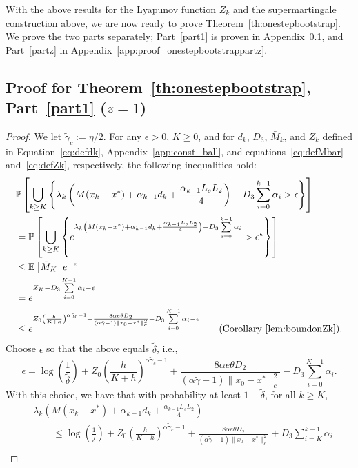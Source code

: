 \documentclass{article}
\newcommand{\lrset}[1]{\left\{ #1 \right\}}
\newcommand{\lrp}[1]{\left( #1 \right)}
\newcommand{\lrs}[1]{\left[ #1 \right]}
\newcommand{\E}[1]{\mathbb{E}\lrs{#1}}
\newcommand{\Prob}[1]{\mathbb{P}\lrs{#1}}
\begin{document}
With the above results for the Lyapunov function $Z_k$ and the supermartingale construction above, we are now ready to prove Theorem~\ref{th:onestepbootstrap}. We prove the two parts separately; Part~\ref{part1} is proven in Appendix~\ref{app:proof_onestepbootstrappart1}, and Part~\ref{partz} in Appendix~\ref{app:proof_onestepbootstrappartz}. 
\subsection{Proof for Theorem~\ref{th:onestepbootstrap}, Part~\ref{part1} ($z = 1$)}\label{app:proof_onestepbootstrappart1}
\begin{proof}
    We let $\tilde{\gamma}_c := \eta/2$.  For any $\epsilon > 0$, $K \ge 0$, and for $d_k$, $D_3$, $\bar{M}_k$, and $Z_k$ defined in Equation~\eqref{eq:defdk}, Appendix~\ref{app:const_ball}, and equations~\eqref{eq:defMbar} and~\eqref{eq:defZk},  respectively, the following inequalities hold: 
    \begin{align*}
        &\Prob{\bigcup\limits_{ k \ge K} \lrset{ \lambda_k \lrp{ M(x_k - x^*) + \alpha_{k-1} d_k + \frac{\alpha_{k-1} L_sL_2}{4}} - D_3\sum\limits_{i=0}^{k-1} \alpha_i   > \epsilon } }\\
        &= \Prob{\bigcup\limits_{ k \ge K} \lrset{ e^{\lambda_k \lrp{ M(x_k - x^*) + \alpha_{k-1} d_k + \frac{\alpha_{k-1} L_sL_2}{4}} - D_3\sum\limits_{i=0}^{k-1} \alpha_i }  > e^{\epsilon}} } \\
        &\le \E{\bar{M}_K} e^{-\epsilon} \\
        &= e^{Z_K - D_3 \sum\limits_{i=0}^{K-1}\alpha_i - \epsilon} \\
        &\le e^{Z_0\lrp{\frac{h}{K+h}}^{\alpha\tilde{\gamma}_c - 1} + \frac{8 \alpha e \theta D_2}{(\alpha \tilde{\gamma} - 1)\|x_0 - x^*\|^2_c}  - D_3 \sum\limits_{i=0}^{K-1}\alpha_i - \epsilon} \tag{Corollary~\ref{lem:boundonZk}}.
    \end{align*}
Choose $\epsilon$ so that the above equals $\tilde{\delta}$, i.e., 
\[ \epsilon = \log\left(\frac{1}{\tilde{\delta}}\right) + Z_0\lrp{\frac{h}{K+h}}^{\alpha\tilde{\gamma}_c - 1} + \frac{8\alpha e \theta D_2}{(\alpha \tilde{\gamma} - 1)\|x_0 - x^*\|^2_c}  - D_3 \sum\limits_{i=0}^{K-1}\alpha_i. \]
With this choice, we have that with probability at least $1-\tilde{\delta}$, for all $k \ge K$, 
\begin{align*}
    &\lambda_k \lrp{M(x_k - x^*) + \alpha_{k-1} d_k + \frac{\alpha_{k-1} L_sL_2}{4} } \\
    &\qquad \le \log\left(\frac{1}{\tilde{\delta}}\right) + Z_0\lrp{\frac{h}{K+h}}^{\alpha\tilde{\gamma}_c - 1}+ \frac{8\alpha e \theta D_2}{(\alpha \tilde{\gamma} - 1)\|x_0 - x^*\|^2_c} + D_3 \sum\limits_{i=K}^{k-1}\alpha_i \\ 

\end{align*}
\end{proof}
\end{document}
